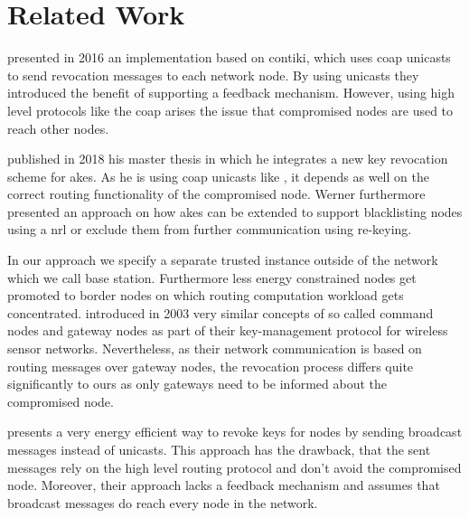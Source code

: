 \documentclass[conference]{IEEEtran}
\begin{document}
\section{Related Work}\label{sec:related_work}
\citeauthor{raza2016s3k} \cite{raza2016s3k} presented in 2016 an implementation based on contiki, which uses \acs{coap} unicasts to send revocation messages to each network node. 
By using unicasts they introduced the benefit of supporting a feedback mechanism. 
However, using high level protocols like the \ac{coap} arises the issue that compromised nodes are used to reach other nodes.

\citeauthor{DanielWerner} \cite{DanielWerner} published in 2018 his master thesis in which he integrates a new key revocation scheme for \ac{akes}. 
As he is using \ac{coap} unicasts like \cite{raza2016s3k}, it depends as well on the correct routing functionality of the compromised node. 
Werner furthermore presented an approach on how \ac{akes} can be extended to support blacklisting nodes using a \ac{nrl} or exclude them from further communication using re-keying.

In our approach we specify a separate trusted instance outside of the network which we call base station. 
Furthermore less energy constrained nodes get promoted to border nodes on which routing computation workload gets concentrated.
\citeauthor{jolly2003low} \cite{jolly2003low} introduced in 2003 very similar concepts of so called command nodes and gateway nodes as part of their key-management protocol for wireless sensor networks.
Nevertheless, as their network communication is based on routing messages over gateway nodes, the revocation process differs quite significantly to ours as only gateways need to be informed about the compromised node.

\citeauthor{wang2007keyrev} \cite{wang2007keyrev} presents a very energy efficient way to revoke keys for nodes by sending broadcast messages instead of unicasts. 
This approach has the drawback, that the sent messages rely on the high level routing protocol and don't avoid the compromised node. 
Moreover, their approach lacks a feedback mechanism and assumes that broadcast messages do reach every node in the network.
\end{document}
